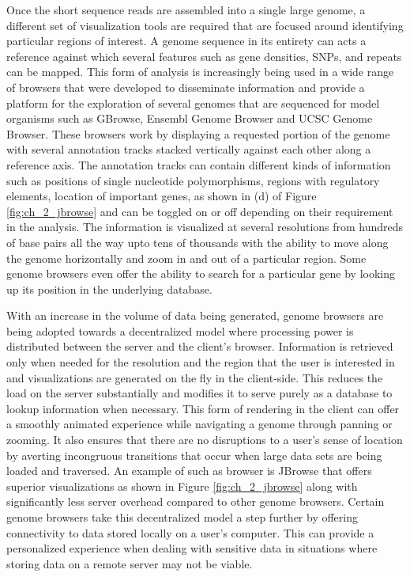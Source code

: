 Once the short sequence reads are assembled into a single large genome, a different set of visualization tools are required that are focused around identifying particular regions of interest. A genome sequence in its entirety can acts a reference against which several features such as gene densities, SNPs, and repeats can be mapped. This form of analysis is increasingly being used in a wide range of browsers that were developed to disseminate information and provide a platform for the exploration of several genomes that are sequenced for model organisms such as GBrowse\cite{stein2002generic}, Ensembl Genome Browser\cite{stalker2004ensembl} and UCSC Genome Browser\cite{ucscgenome}. These browsers work by displaying a requested portion of the genome with several annotation tracks stacked vertically against each other along a reference axis. The annotation tracks can contain different kinds of information such as positions of single nucleotide polymorphisms, regions with regulatory elements, location of important genes, as shown in (d) of Figure \ref{fig:ch_2_jbrowse} and can be toggled on or off depending on their requirement in the analysis. The information is visualized at several resolutions from hundreds of base pairs all the way upto tens of thousands with the ability to move along the genome horizontally and zoom in and out of a particular region. Some genome browsers even offer the ability to search for a particular gene by looking up its position in the underlying database\cite{nielsen2010visualizing}. 


With an increase in the volume of data being generated, genome browsers are being adopted towards a decentralized model where processing power is distributed between the server and the client's browser. Information is retrieved only when needed for the resolution and the region that the user is interested in and visualizations are generated on the fly in the client-side. This reduces the load on the server substantially and modifies it to serve purely as a database to lookup information when necessary. This form of rendering in the client can offer a smoothly animated experience while navigating a genome through panning or zooming. It also ensures that there are no disruptions to a user's sense of location by averting incongruous transitions that occur when large data sets are being loaded and traversed. An example of such as browser is JBrowse that offers superior visualizations as shown in Figure \ref{fig:ch_2_jbrowse} along with significantly less server overhead compared to other genome browsers\cite{skinner2009jbrowse}.
Certain genome browsers take this decentralized model a step further by offering connectivity to data stored locally on a user's computer\cite{ucscgenome,saito2009utgb}. This can provide a personalized experience when dealing with sensitive data in situations where storing data on a remote server may not be viable. 

